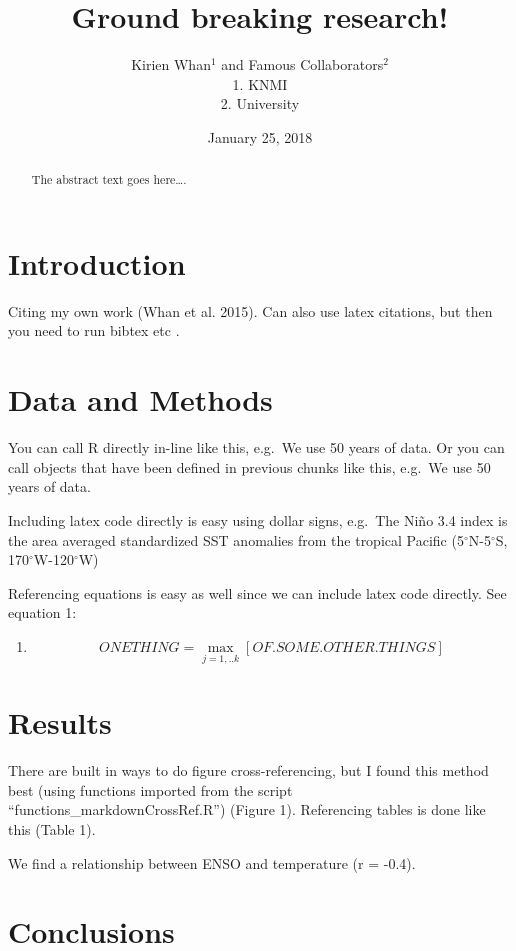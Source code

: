 \documentclass[]{article}
\title{Ground breaking research!}
\author{Kirien Whan\(^1\) and Famous Collaborators\(^2\)\\
1. KNMI\\
2. University}
\date{January 25, 2018}
\providecommand{\tightlist}{%
  \setlength{\itemsep}{0pt}\setlength{\parskip}{0pt}}
\begin{document}
\maketitle
\begin{abstract}
The abstract text goes here\ldots{}.
\end{abstract}

\section{Introduction}\label{introduction}

Citing my own work (Whan et al. 2015). Can also use latex citations, but
then you need to run bibtex etc \citep{whan2015impact}.

\section{Data and Methods}\label{data-and-methods}

You can call R directly in-line like this, e.g.~We use 50 years of data.
Or you can call objects that have been defined in previous chunks like
this, e.g.~We use 50 years of data.

Including latex code directly is easy using dollar signs, e.g.~The Niño
3.4 index is the area averaged standardized SST anomalies from the
tropical Pacific (5\(^{\circ}\)N-5\(^{\circ}\)S,
170\(^{\circ}\)W-120\(^{\circ}\)W)

Referencing equations is easy as well since we can include latex code
directly. See equation 1:

\begin{enumerate}
\def\labelenumi{(\arabic{enumi})}
\tightlist
\item
  \[  ONETHING  = \max\limits_{j=1,..k}[OF.SOME.OTHER.THINGS] \]
\end{enumerate}

\section{Results}\label{results}

There are built in ways to do figure cross-referencing, but I found this
method best (using functions imported from the script
``functions\_markdownCrossRef.R'') (Figure 1). Referencing tables is
done like this (Table 1).

We find a relationship between ENSO and temperature (r = -0.4).

\section{Conclusions}\label{conclusions}
\end{document}
